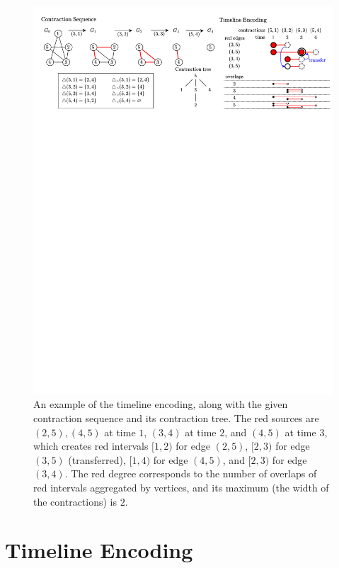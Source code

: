 \documentclass[a4paper,UKenglish,cleveref, autoref, thm-restate]{lipics-v2021}
\begin{document}
\begin{figure}[t!]
    \centering
    \includegraphics[clip,width=1.0\textwidth,trim={80 3200 80 0}]{images/timeline.png}
    \caption{An example of the timeline encoding,
    along with the given contraction sequence and its contraction tree.
    The red sources are
    $(2,5), (4,5)$ at time $1$, $(3,4)$ at time $2$, and $(4,5)$ at time $3$,
    which creates red intervals
    $[1,2)$ for edge $(2,5)$,
    $[2,3)$ for edge $(3,5)$ (transferred),
    $[1,4)$ for edge $(4,5)$, and
    $[2,3)$ for edge $(3,4)$.
    The red degree corresponds to the number of overlaps of red intervals aggregated by
    vertices, and its maximum (the width of the contractions) is $2$.
    }
    \label{fig:timeline} 
\end{figure}

\section{Timeline Encoding}
\end{document}
